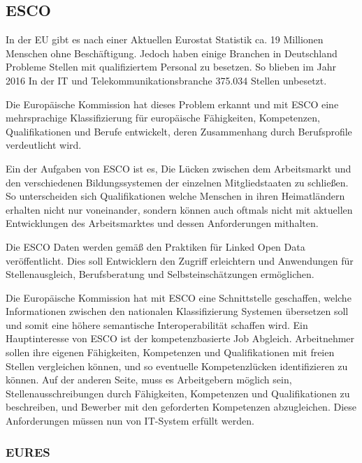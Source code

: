 
\subsection{ESCO}

In der EU gibt es nach einer Aktuellen Eurostat Statistik ca. 19 Millionen Menschen ohne Beschäftigung. Jedoch haben einige Branchen in Deutschland Probleme Stellen mit qualifiziertem Personal zu besetzen. So blieben im Jahr 2016 In der IT und Telekommunikationsbranche 375.034 Stellen unbesetzt.\cite{Statista2016}
 
Die Europäische Kommission hat dieses Problem erkannt und mit ESCO eine mehrsprachige Klassifizierung für europäische Fähigkeiten, Kompetenzen, Qualifikationen und Berufe entwickelt, deren Zusammenhang durch Berufsprofile verdeutlicht wird.
 
Ein der Aufgaben von ESCO ist es, Die Lücken zwischen dem Arbeitsmarkt und den verschiedenen Bildungssystemen der einzelnen Mitgliedstaaten zu schließen. So unterscheiden sich Qualifikationen welche Menschen in ihren Heimatländern erhalten nicht nur voneinander, sondern können auch oftmals nicht mit aktuellen Entwicklungen des Arbeitsmarktes und dessen Anforderungen mithalten.

Die ESCO Daten werden gemäß den Praktiken für Linked Open Data veröffentlicht. Dies soll Entwicklern den Zugriff erleichtern und Anwendungen für Stellenausgleich, Berufsberatung und Selbsteinschätzungen ermöglichen.

Die Europäische Kommission hat mit ESCO eine Schnittstelle geschaffen, welche Informationen zwischen den nationalen Klassifizierung Systemen übersetzen soll und somit eine höhere semantische Interoperabilität schaffen wird. Ein Hauptinteresse von ESCO ist der kompetenzbasierte Job Abgleich. Arbeitnehmer sollen ihre eigenen Fähigkeiten, Kompetenzen und Qualifikationen mit freien Stellen vergleichen können, und so eventuelle Kompetenzlücken identifizieren zu können. Auf der anderen Seite, muss es Arbeitgebern möglich sein, Stellenausschreibungen durch  Fähigkeiten, Kompetenzen und Qualifikationen zu beschreiben, und Bewerber mit den geforderten Kompetenzen abzugleichen. Diese Anforderungen müssen nun von IT-System erfüllt werden. 

\subsubsection{EURES}

